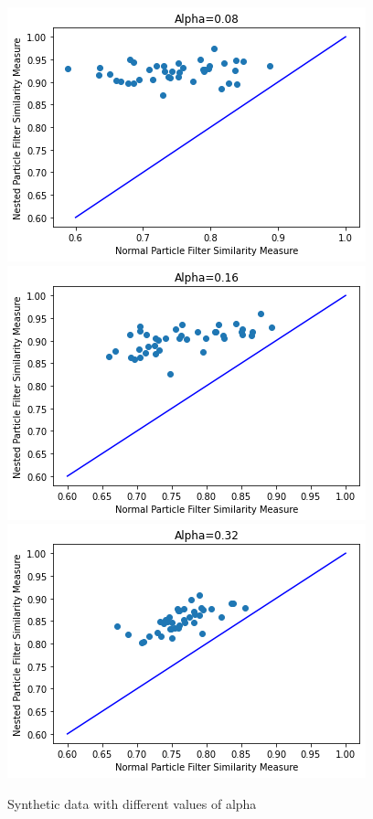\documentclass[12pt,letterpaper]{article}
\begin{document}
\begin{figure}
    \centering
    \includegraphics[scale = 0.4]{Images/synthetic_plot1.png}
    \includegraphics[scale = 0.4]{Images/synthetic_plot2.png}
    \includegraphics[scale = 0.4]{Images/synthetic_plot3.png}
    \caption{Synthetic data with different values of alpha}
\end{figure}
\end{document}
